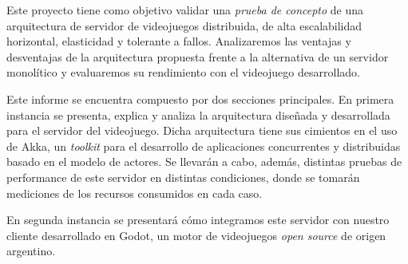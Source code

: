 \noindent Este proyecto tiene como objetivo validar una \textit{prueba de concepto} de
una arquitectura de servidor de videojuegos distribuida, de alta escalabilidad horizontal,
elasticidad y tolerante a fallos. Analizaremos las ventajas y desventajas de la arquitectura
propuesta frente a la alternativa de un servidor monolítico y evaluaremos su rendimiento
con el videojuego desarrollado.
 
Este informe se encuentra compuesto por dos secciones principales. En primera
instancia se presenta, explica y analiza la arquitectura diseñada y desarrollada para el
servidor del videojuego. Dicha arquitectura tiene sus cimientos en el uso de Akka, un 
\textit{toolkit} para el desarrollo de aplicaciones concurrentes y distribuidas basado
en el modelo de actores. Se llevarán a cabo, además, distintas pruebas de performance de este
servidor en distintas condiciones, donde se tomarán mediciones de los recursos consumidos en cada caso.

En segunda instancia se presentará cómo integramos este servidor
con nuestro cliente desarrollado en Godot, un motor de videojuegos \textit{open source} de origen argentino. 
